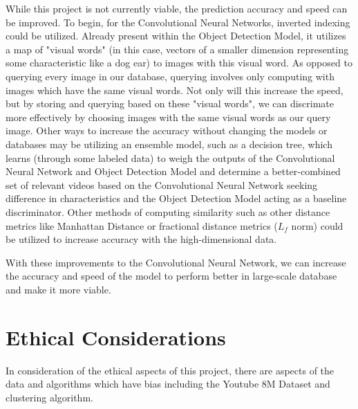 \documentclass[10pt,twocolumn]{article}
\begin{document}
While this project is not currently viable, the prediction accuracy and speed can be improved. To begin, for the Convolutional Neural Networks, inverted indexing could be utilized. Already present within the Object Detection Model, it utilizes a map of "visual words" (in this case, vectors of a smaller dimension representing some characteristic like a dog ear) to images with this visual word. As opposed to querying every image in our database, querying involves only computing with images which have the same visual words. Not only will this increase the speed, but by storing and querying based on these "visual words", we can discrimate more effectively by choosing images with the same visual words as our query image. Other ways to increase the accuracy without changing the models or databases may be utilizing an ensemble model, such as a decision tree, which learns (through some labeled data) to weigh the outputs of the Convolutional Neural Network and Object Detection Model and determine a better-combined set of relevant videos based on the Convolutional Neural Network seeking difference in characteristics and the Object Detection Model acting as a baseline discriminator. Other methods of computing similarity such as other distance metrics like Manhattan Distance or fractional distance metrics ($L_f$ norm) \cite{SUPRISINGBEHAVIOR TODO} could be utilized to increase accuracy with the high-dimensional data.

With these improvements to the Convolutional Neural Network, we can increase the accuracy and speed of the model to perform better in large-scale database and make it more viable.

\section {Ethical Considerations}



In consideration of the ethical aspects of this project, there are aspects of the data and algorithms which have bias including the Youtube 8M Dataset and clustering algorithm.
\end{document}
